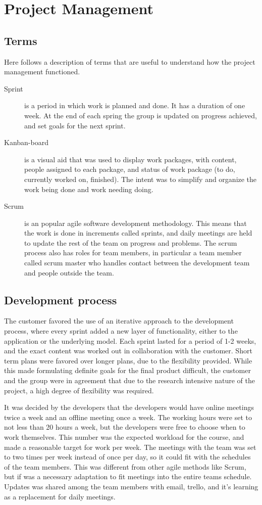 \chapter{Project Management}
\section{Terms}
Here follows a description of terms that are useful to understand how the project management functioned. 

\begin{description}
\item[Sprint] is a period in which work is planned and done. It has a duration of one week. At the end of each spring the group is updated on progress achieved, and set goals for the next sprint. 
\item[Kanban-board] is a visual aid that was used to display work packages, with content, people assigned to each package, and status of work package (to do, currently worked on, finished). The intent was to simplify and organize the work being done and work needing doing.
\item[Scrum] is an popular agile software development methodology. This means that the work is done in increments called sprints, and daily meetings are held to update the rest of the team on progress and problems. The scrum process also has roles for team members, in particular a team member called scrum master who handles contact between the development team and people outside the team.
\end{description}
\section{Development process}

The customer favored the use of an iterative approach to the development process, where every sprint added a new layer of functionality, either to the application or the underlying model. Each sprint lasted for a period of 1-2 weeks, and the exact content was worked out in collaboration with the customer. Short term plans were favored over longer plans, due to the flexibility provided. While this made formulating definite goals for the final product difficult, the customer and the group were in agreement that due to the research intensive nature of the project, a high degree of flexibility was required. 

It was decided by the developers that the developers would have online meetings twice a week and an offline meeting once a week. 
The working hours were set to not less than 20 hours a week, but the developers were free to choose when to work themselves. This number was the expected workload for the course, and made a reasonable target for work per week. The meetings with the team was set to two times per week instead of once per day, so it could fit with the schedules of the team members. This was different from other agile methods like Scrum, but if was a necessary adaptation to fit meetings into the entire teams schedule. Updates was shared among the team members with email, trello, and it's learning as a replacement for daily meetings.


